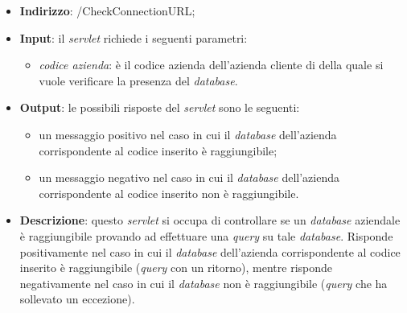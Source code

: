 
\begin{itemize}
	\item \textbf{Indirizzo}: /CheckConnectionURL;
	\item \textbf{Input}: il \textit{servlet} richiede i seguenti parametri:
		\begin{itemize}
			\item \textit{codice azienda}: è il codice azienda dell'azienda cliente di \visione{} della quale si vuole verificare la presenza del \textit{database}.
		\end{itemize}
	\item \textbf{Output}: le possibili risposte del \textit{servlet} sono le seguenti:
		\begin{itemize}
			\item un messaggio positivo nel caso in cui il \textit{database} dell'azienda corrispondente al codice inserito è raggiungibile;
			\item un messaggio negativo nel caso in cui il \textit{database} dell'azienda corrispondente al codice inserito non è raggiungibile.
		\end{itemize}
	\item \textbf{Descrizione}: questo \textit{servlet} si occupa di controllare se un \textit{database} aziendale è raggiungibile provando ad effettuare una \textit{query} su tale \textit{database}. Risponde positivamente nel caso in cui il \textit{database} dell'azienda corrispondente al codice inserito è raggiungibile (\textit{query} con un ritorno), mentre risponde negativamente nel caso in cui il \textit{database} non è raggiungibile (\textit{query} che ha sollevato un eccezione).
\end{itemize}


